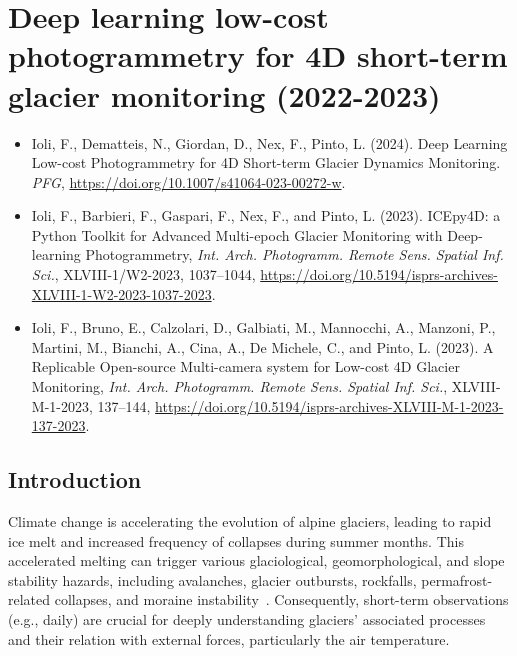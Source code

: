 \graphicspath{{figures/chapter4/}}
\onehalfspacing

\chapter{Deep learning low-cost photogrammetry for 4D short-term glacier monitoring
  (2022-2023)}\label{ch:4}



\begin{itemize}
  \item Ioli, F., Dematteis, N., Giordan, D., Nex, F., Pinto, L. (2024). Deep Learning Low-cost Photogrammetry for 4D Short-term Glacier Dynamics Monitoring. \textit{PFG}, \footnotesize{\url{https://doi.org/10.1007/s41064-023-00272-w}}.
  \item Ioli, F., Barbieri, F., Gaspari, F., Nex, F., and Pinto, L. (2023).
  ICEpy4D: a Python Toolkit for Advanced Multi-epoch Glacier Monitoring with Deep-learning Photogrammetry, \textit{Int. Arch. Photogramm. Remote Sens. Spatial Inf. Sci.}, XLVIII-1/W2-2023, 1037–1044, \footnotesize{\url{https://doi.org/10.5194/isprs-archives-XLVIII-1-W2-2023-1037-2023}}.
  \item Ioli, F., Bruno, E., Calzolari, D., Galbiati, M., Mannocchi, A., Manzoni, P., Martini, M., Bianchi, A., Cina, A., De Michele, C., and Pinto, L. (2023). A Replicable Open-source Multi-camera system for Low-cost 4D Glacier Monitoring, \textit{Int. Arch. Photogramm. Remote Sens. Spatial Inf. Sci.}, XLVIII-M-1-2023, 137–144, \footnotesize{\url{https://doi.org/10.5194/isprs-archives-XLVIII-M-1-2023-137-2023}}.
\end{itemize}

\newpage

\section{Introduction}\label{sec:4:intro}

Climate change is accelerating the evolution of alpine glaciers, leading to rapid ice melt and increased frequency of collapses during summer months. 
This accelerated melting can trigger various glaciological, geomorphological, and slope stability hazards, including avalanches, glacier outbursts, rockfalls, permafrost-related collapses, and moraine instability~\citep{Kaab2005, Faillettaz2015, chiarle2023, Nigrelli2024}.
Consequently, short-term observations (e.g., daily) are crucial for deeply understanding glaciers' associated processes and their relation with external forces, particularly the air temperature.

